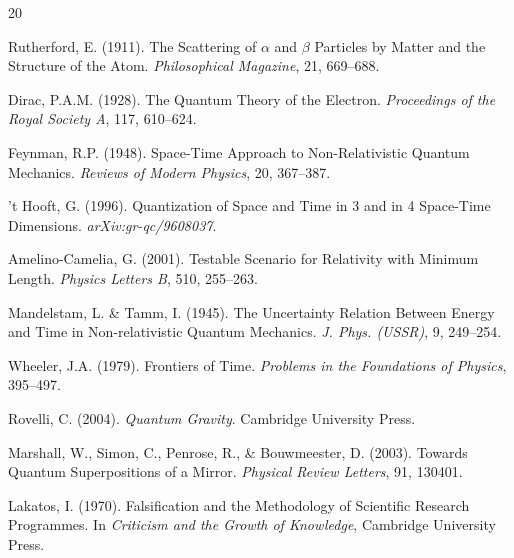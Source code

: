 \documentclass[11pt,a4paper]{article}
\begin{document}
\begin{thebibliography}{20}

Rutherford, E. (1911). The Scattering of $\alpha$ and $\beta$ Particles by Matter and the Structure of the Atom. \textit{Philosophical Magazine}, 21, 669--688.

Dirac, P.A.M. (1928). The Quantum Theory of the Electron. \textit{Proceedings of the Royal Society A}, 117, 610--624.

Feynman, R.P. (1948). Space-Time Approach to Non-Relativistic Quantum Mechanics. \textit{Reviews of Modern Physics}, 20, 367--387.

't Hooft, G. (1996). Quantization of Space and Time in 3 and in 4 Space-Time Dimensions. \textit{arXiv:gr-qc/9608037}.

Amelino-Camelia, G. (2001). Testable Scenario for Relativity with Minimum Length. \textit{Physics Letters B}, 510, 255--263.

Mandelstam, L. \& Tamm, I. (1945). The Uncertainty Relation Between Energy and Time in Non-relativistic Quantum Mechanics. \textit{J. Phys. (USSR)}, 9, 249--254.

Wheeler, J.A. (1979). Frontiers of Time. \textit{Problems in the Foundations of Physics}, 395--497.

Rovelli, C. (2004). \textit{Quantum Gravity}. Cambridge University Press.

Marshall, W., Simon, C., Penrose, R., \& Bouwmeester, D. (2003). Towards Quantum Superpositions of a Mirror. \textit{Physical Review Letters}, 91, 130401.

Lakatos, I. (1970). Falsification and the Methodology of Scientific Research Programmes. In \textit{Criticism and the Growth of Knowledge}, Cambridge University Press.

\end{thebibliography}
\end{document}
